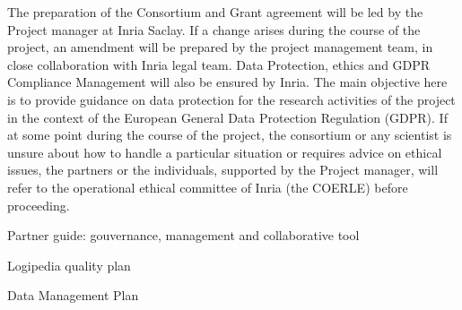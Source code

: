 \begin{workpackage}[id=management,type=MGT,wphases=1-48,
  short=Management,
  title=Management,
  InrRM=44,
  lead=Inr]
\begin{tasklist}
  \begin{task}[id=legal,title={Legal Management (data, ethics, GDPR)},shorttitle={Legal},
      lead=Inr,InrRM=4,wphases=1-48]
    The preparation of the Consortium and Grant agreement will be led
    by the Project manager at Inria Saclay. If a change
    arises during the course of the project, an amendment will be
    prepared by the project management team, in close collaboration
    with Inria legal team.  Data Protection, ethics and GDPR
    Compliance Management will also be ensured by Inria. The main
    objective here is to provide guidance on data protection for the
    research activities of the project in the context of the European
    General Data Protection Regulation (GDPR). If at some point during
    the course of the project, the consortium or any scientist is
    unsure about how to handle a particular situation or requires
    advice on ethical issues, the partners or the individuals,
    supported by the Project manager, will refer to the operational ethical
    committee of Inria (the COERLE) before proceeding.
  \end{task}
\end{tasklist}

\begin{wpdelivs}

\begin{wpdeliv}[due=3,id=guide,dissem=PU,nature=R,lead=Inr,task=coordination]{
Partner guide: gouvernance, management and collaborative tool}
\end{wpdeliv}

\begin{wpdeliv}[due=3,id=collab-tools,dissem=PU,nature=R,lead=Inr, task=coordination]{Logipedia quality plan}\end{wpdeliv}



\begin{wpdeliv}[due=4,id=data-plan,dissem=PU,nature=R,lead=Inr, task=coordination]{Data Management Plan}\end{wpdeliv}

\end{wpdelivs}





\end{workpackage}

